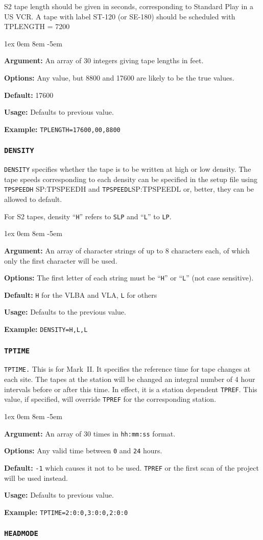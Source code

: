 \documentclass{report}
\newcommand{\rcwbox}[5]{
  \begin{list}{}{\parsep 1ex  \itemsep 0em
                 \leftmargin 8em  \itemindent -5em }
    \item {\bf Argument:} #1
    \item {\bf Options:}  #2
    \item {\bf Default:}  #3
    \item {\bf Usage:}    #4
    \item {\bf Example:}  #5
  \end{list}
}
\begin{document}
S2 tape length should be given in seconds, corresponding to Standard
Play in a US VCR. A tape with label ST-120 (or SE-180) should be
scheduled with TPLENGTH = 7200


\rcwbox
{An array of 30 integers giving tape lengths in feet.}
{Any value, but 8800 and 17600 are likely to be the true values.}
{17600}
{Defaults to previous value.}
{{\tt TPLENGTH=17600,00,8800}}

\subsubsection{\label{TP:DENSITY}{\tt DENSITY}}

{\tt DENSITY} specifies whether the tape is to be written at
high or low density.  The tape speeds corresponding to each density
can be specified in the setup file using {\tt TPSPEEDH} {SP:TPSPEEDH}
and {\tt TPSPEEDL}{SP:TPSPEEDL} or, better, they can be allowed to
default.

For S2 tapes, density ``{\tt H}'' refers to {\tt SLP} and ``{\tt L}''
to {\tt LP}.

\rcwbox
{An array of character strings of up to 8 characters each, of which
only the first character will be used.}
{The first letter of each string must be ``{\tt H}'' or ``{\tt L}''
(not case sensitive).}
{{\tt H} for the VLBA and VLA, {\tt L} for others}
{Defaults to the previous value.}
{{\tt DENSITY=H,L,L}}

\subsubsection{\label{TP:TPTIME}{\tt TPTIME}}

{\tt TPTIME.} This is for Mark~II. It specifies the reference
time for tape changes at each  site. The tapes at the station will be
changed an integral number of 4 hour intervals before or after this
time. In effect, it is a station dependent {\tt TPREF}. This value, if
specified, will override {\tt TPREF} for the corresponding station.

\rcwbox
{An array of 30 times in {\tt hh:mm:ss} format.}
{Any valid time between {\tt 0} and {\tt 24} hours.}
{{\tt -1} which causes it not to be used. {\tt TPREF} or the first
scan of the project will be used instead.}
{Defaults to previous value.}
{{\tt TPTIME=2:0:0,3:0:0,2:0:0}}

\subsubsection{\label{TP:HEADMODE}{\tt HEADMODE}}
\end{document}

